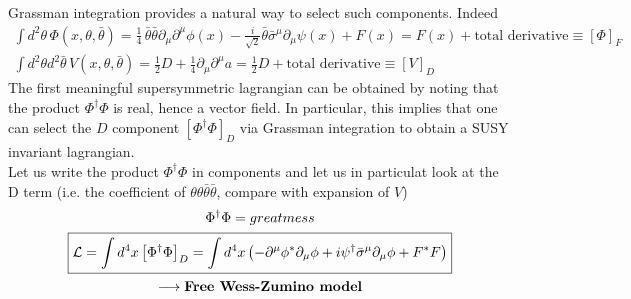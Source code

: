 \documentclass[12pt]{article}
\begin{document}
\newpage

Grassman integration provides a natural way to select such components. Indeed 
\begin{gather*}
  \int d^2\theta \, \Phi(x, \theta, \bar\theta) = \frac{1}{4} \, \bar\theta \bar\theta \partial_\mu \partial^\mu \phi(x) - \frac{i}{\sqrt{2}} \bar\theta \bar\sigma^\mu \partial_\mu \psi(x) + F(x) = F(x) + \text{total derivative} \equiv \left[\Phi\right]_F \\
  \int d^2\theta d^2\bar\theta \, V(x, \theta, \bar\theta) = \frac{1}{2} D + \frac{1}{4} \partial_\mu \partial^\mu a = \frac{1}{2} D + \text{total derivative} \equiv \left[V\right]_D
\end{gather*}
The first meaningful supersymmetric lagrangian can be obtained by noting that the product $\Phi^\dagger\Phi$ is real, hence a vector field. In particular, this implies that one can select the $D$ component $\left[\Phi^\dagger\Phi\right]_D$ via Grassman integration to obtain a SUSY invariant lagrangian. \\
Let us write the product $\Phi^\dagger\Phi$ in components and let us in particulat look at the D term (i.e. the coefficient of $\theta\theta\bar\theta\bar\theta$, compare with expansion of $V$)
\begin{gather*}
  \Phi^\dagger\Phi = great mess \\
  \boxed{\mathcal{L} = \int d^4 x \left[\Phi^\dagger\Phi\right]_D = \int d^4 x \left( -\partial^\mu \phi^* \partial_\mu \phi + i \psi^\dagger \bar\sigma^\mu \partial_\mu \phi + F^*F \right)} \\
  \longrightarrow \text{\bfseries Free Wess-Zumino model}
\end{gather*}



\newpage
\end{document}
